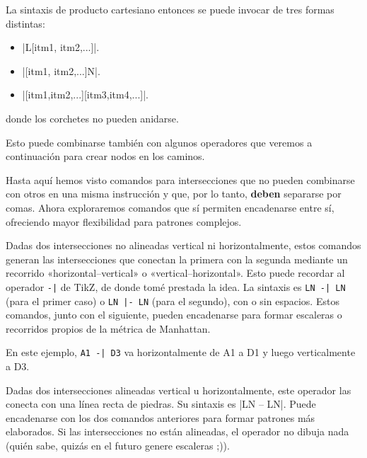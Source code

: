 \begin{goban}[9, stone = {radius = 4pt}, mark = {line = {color = red}}]
	La sintaxis de producto cartesiano entonces se puede invocar de tres formas distintas:
\begin{itemize}
	\item |L[itm1, itm2,...]|.
	\item |[itm1, itm2,...]N|.
	\item |[itm1,itm2,...][itm3,itm4,...]|.
\end{itemize}
donde los corchetes no pueden anidarse. 

Esto puede combinarse tambi\'en con algunos operadores que veremos a continuaci\'on para crear nodos en los caminos.

Hasta aquí hemos visto comandos para intersecciones que no pueden combinarse con otros en una misma instrucción y que, por lo tanto, \textbf{deben} separarse por comas. Ahora exploraremos comandos que sí permiten encadenarse entre sí, ofreciendo mayor flexibilidad para patrones complejos.


Dadas dos intersecciones no alineadas vertical ni horizontalmente, estos comandos generan las intersecciones que conectan la primera con la segunda mediante un recorrido «horizontal--vertical» o «vertical--horizontal». Esto puede recordar al operador \verb+-|+ de TikZ, de donde tomé prestada la idea. La sintaxis es \verb+LN -| LN+ (para el primer caso) o \verb+LN |- LN+ (para el segundo), con o sin espacios. Estos comandos, junto con el siguiente, pueden encadenarse para formar escaleras o recorridos propios de la m\'etrica de Manhattan.

\begin{codeexample}[width=6cm]
	\begin{goban}[label = {at = all}]
	\end{goban}
\end{codeexample}

En este ejemplo, \verb+A1 -| D3+ va horizontalmente de A1 a D1 y luego verticalmente a D3.


Dadas dos intersecciones alineadas vertical u horizontalmente, este operador las conecta con una línea recta de piedras. Su sintaxis es |LN -- LN|. Puede encadenarse con los dos comandos anteriores para formar patrones más elaborados. Si las intersecciones no están alineadas, el operador no dibuja nada (quién sabe, quizás en el futuro genere escaleras ;)).


\end{goban}
